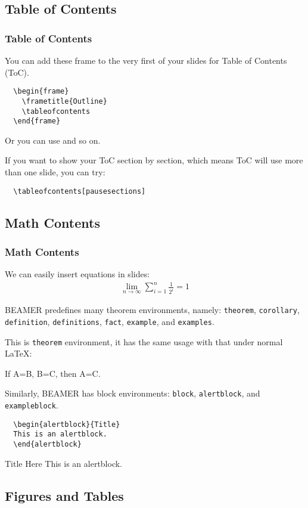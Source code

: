 \documentclass{beamer}
\newcommand{\Beamer}{\textrm{BEAMER}}
\newcommand{\cmd}[2][blue]{{\color{#1}{\ttfamily\char92 #2}}}
\newcommand{\env}[1]{\texttt{#1}}
\newcommand{\dpar}{\\ \mbox{}}
\begin{document}
\subsection{Table of Contents}
\begin{frame}[fragile]
  \frametitle{Table of Contents}
  You can add these frame to the very first of your slides for Table of Contents (ToC). 
  \begin{lstlisting}
  \begin{frame}
    \frametitle{Outline}
    \tableofcontents
  \end{frame}
  \end{lstlisting}
  
  Or you can use \cmd{AtBeginSection} and so on.\dpar
  
  If you want to show your ToC section by section, which means ToC will use more than one slide, you can try:
  \begin{lstlisting}
  \tableofcontents[pausesections]
  \end{lstlisting}
\end{frame}

\subsection{Math Contents}
\begin{frame}
  \frametitle{Math Contents}
  We can easily insert equations in slides:
  \begin{gather}
  \lim_{n\rightarrow\infty} \sum_{i=1}^n \frac{1}{2^i} = 1
  \end{gather}
  
  \Beamer{} predefines many theorem environments, namely: \env{theorem}, \env{corollary}, \env{definition}, \env{definitions}, \env{fact}, \env{example}, and \env{examples}.
\end{frame}

\begin{frame}[fragile]
  This is \env{theorem} environment, it has the same usage with that under normal \LaTeX:
  \begin{theorem}
  If A=B, B=C, then A=C. 
  \end{theorem}
  
  Similarly, \Beamer{} has block environments: \env{block}, \env{alertblock}, and \env{exampleblock}.
  \begin{lstlisting}
  \begin{alertblock}{Title}
  This is an alertblock.
  \end{alertblock}
  \end{lstlisting}
  
  \begin{alertblock}{Title Here}
  This is an alertblock.
  \end{alertblock}
  
\end{frame}

\subsection{Figures and Tables}
\end{document}
